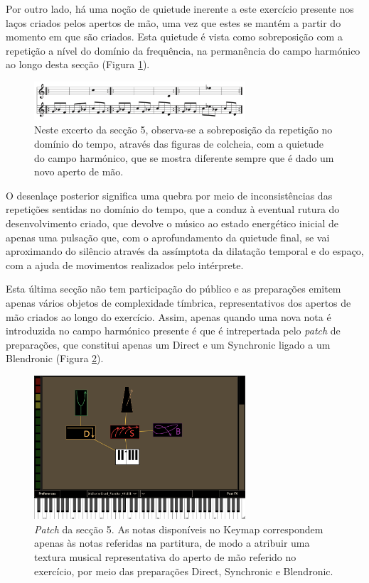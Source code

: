 \documentclass[../main.tex]{subfiles}
\begin{document}
Por outro lado, há uma noção de quietude inerente a este exercício presente nos laços criados pelos apertos de mão, uma vez que estes se mantém a partir do momento em que são criados. Esta quietude é vista como sobreposição com a repetição a nível do domínio da frequência, na permanência do campo harmónico ao longo desta secção (Figura \ref{fig:obra5}).

\begin{figure}[h]
    \centering
    \captionsetup{width=0.8\textwidth}
    \includegraphics[width=0.7\textwidth]{images/obra5.png}
    \caption{Neste excerto da secção 5, observa-se a sobreposição da repetição no domínio do tempo, através das figuras de colcheia, com a quietude do campo harmónico, que se mostra diferente sempre que é dado um novo aperto de mão.}
    \label{fig:obra5}
\end{figure}

O desenlaçe posterior significa uma quebra por meio de inconsistências das repetições sentidas no domínio do tempo, que a conduz à eventual rutura do desenvolvimento criado, que devolve o músico ao estado energético inicial de apenas uma pulsação que, com o aprofundamento da quietude final, se vai aproximando do silêncio através da assímptota da dilatação temporal e do espaço, com a ajuda de movimentos realizados pelo intérprete.

Esta última secção não tem participação do público e as preparações emitem apenas vários objetos de complexidade tímbrica, representativos dos apertos de mão criados ao longo do exercício. Assim, apenas quando uma nova nota é introduzida no campo harmónico presente é que é intrepertada pelo \textsl{patch} de preparações, que constitui apenas um Direct e um Synchronic ligado a um Blendronic (Figura \ref{fig:bit5}).

\begin{figure}[h]
    \centering
    \captionsetup{width=0.8\textwidth}
    \includegraphics[width=0.7\textwidth]{images/bit5.png}
    \caption{\textsl{Patch} da secção 5. As notas disponíveis no Keymap correspondem apenas às notas referidas na partitura, de modo a atribuir uma textura musical representativa do aperto de mão referido no exercício, por meio das preparações Direct, Synchronic e Blendronic.}
    \label{fig:bit5}
\end{figure}
\end{document}

